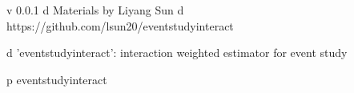 v 0.0.1
d Materials by Liyang Sun
d https://github.com/lsun20/eventstudyinteract

d 'eventstudyinteract': interaction weighted estimator for event study

p eventstudyinteract